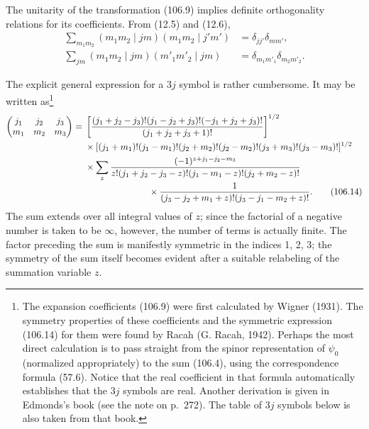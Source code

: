 The unitarity of the transformation (106.9) implies definite orthogonality relations for its coefficients. From (12.5) and (12.6),
\begin{align}
 \sum_{m_1m_2}(m_1m_2\mid jm)(m_1m_2\mid j'm')&=\delta_{jj'}\delta_{mm'}, \tag{106.12}\\
 \sum_{jm}(m_1m_2\mid jm)(m'_1m'_2\mid jm)&=\delta_{m_1m'_1}\delta_{m_2m'_2}. \tag{106.13}
\end{align}

The explicit general expression for a $3j$ symbol is rather cumbersome. It may be written as\footnote{The expansion coefficients (106.9) were first calculated by Wigner (1931). The symmetry properties of these coefficients and the symmetric expression (106.14) for them were found by Racah (G. Racah, 1942). Perhaps the most direct calculation is to pass straight from the spinor representation of $\psi_0$ (normalized appropriately) to the sum (106.4), using the correspondence formula (57.6). Notice that the real coefficient in that formula automatically establishes that the $3j$ symbols are real. Another derivation is given in Edmonds's book (see the note on p.~272). The table of $3j$ symbols below is also taken from that book.}
\begingroup\small
\begin{align}
\begin{pmatrix}j_1&j_2&j_3\\m_1&m_2&m_3\end{pmatrix}
={}&\left[\frac{(j_1+j_2-j_3)!(j_1-j_2+j_3)!(-j_1+j_2+j_3)!}{(j_1+j_2+j_3+1)!}\right]^{1/2}\notag\\
&\times[(j_1+m_1)!(j_1-m_1)!(j_2+m_2)!(j_2-m_2)!(j_3+m_3)!(j_3-m_3)!]^{1/2}\notag\\
&\times\sum_z\frac{(-1)^{z+j_1-j_2-m_3}}{z!(j_1+j_2-j_3-z)!(j_1-m_1-z)!(j_2+m_2-z)!}\notag\\[-2pt]
&\hspace{25mm}\times\frac1{(j_3-j_2+m_1+z)!(j_3-j_1-m_2+z)!}.
\tag{106.14}
\end{align}
\endgroup
The sum extends over all integral values of $z$; since the factorial of a negative number is taken to be $\infty$, however, the number of terms is actually finite. The factor preceding the sum is manifestly symmetric in the indices 1, 2, 3; the symmetry of the sum itself becomes evident after a suitable relabeling of the summation variable $z$.

